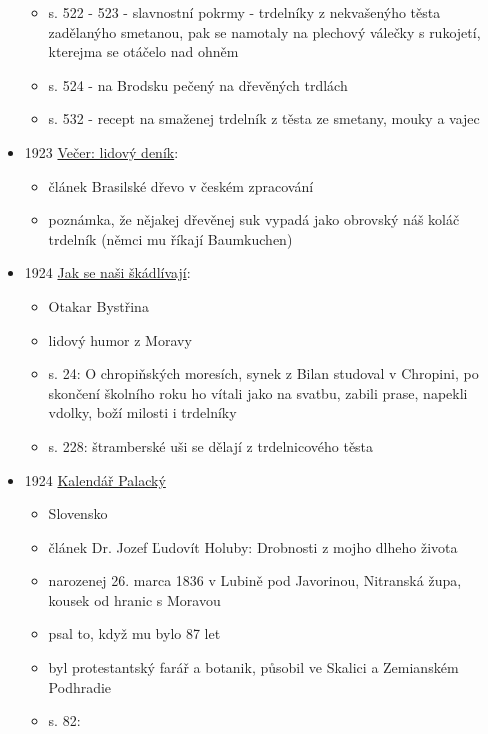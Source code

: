 \begin{itemize}
  \begin{itemize}
  \tightlist
  \item
    s. 522 - 523 - slavnostní pokrmy - trdelníky z nekvašenýho těsta
    zadělanýho smetanou, pak se namotaly na plechový válečky s rukojetí,
    kterejma se otáčelo nad ohněm
  \item
    s. 524 - na Brodsku pečený na dřevěných trdlách
  \item
    s. 532 - recept na smaženej trdelník z těsta ze smetany, mouky a
    vajec
  \end{itemize}
\item
  1923
  \href{https://ceskadigitalniknihovna.cz/uuid/uuid:6ef4c460-b7b1-11e9-8f08-5ef3fc9ae867}{Večer:
  lidový deník}:

  \begin{itemize}
  \tightlist
  \item
    článek Brasilské dřevo v českém zpracování
  \item
    poznámka, že nějakej dřevěnej suk vypadá jako obrovský náš koláč
    trdelník (němci mu říkají Baumkuchen)
  \end{itemize}
\item
  1924
  \href{https://ceskadigitalniknihovna.cz/uuid/uuid:2dbf7a20-4967-11e4-aded-005056827e51}{Jak
  se naši škádlívají}:

  \begin{itemize}
  \tightlist
  \item
    Otakar Bystřina
  \item
    lidový humor z Moravy
  \item
    s. 24: O chropiňských moresích, synek z Bilan studoval v Chropini,
    po skončení školního roku ho vítali jako na svatbu, zabili prase,
    napekli vdolky, boží milosti i trdelníky
  \item
    s. 228: štramberské uši se dělají z trdelnicového těsta
  \end{itemize}
\item
  1924
  \href{https://ceskadigitalniknihovna.cz/uuid/uuid:f0cbc280-f31d-11ed-8fba-005056827e51}{Kalendář
  Palacký}

  \begin{itemize}
  \tightlist
  \item
    Slovensko
  \item
    článek Dr. Jozef Ľudovít Holuby: Drobnosti z mojho dlheho života
  \item
    narozenej 26. marca 1836 v Lubině pod Javorinou, Nitranská župa,
    kousek od hranic s Moravou
  \item
    psal to, když mu bylo 87 let
  \item
    byl protestantský farář a botanik, působil ve Skalici a Zemianském
    Podhradie
  \item
    s. 82:


\end{itemize}
\end{itemize}
